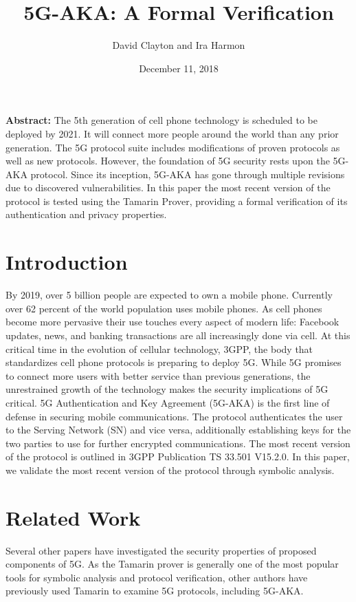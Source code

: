 \documentclass[10pt, pdftex]{article}
\title{5G-AKA: A Formal Verification}
\author{David Clayton and Ira Harmon}
\date{December 11, 2018}
\begin{document}
\maketitle
\textbf{Abstract:} 
The 5th generation of cell phone technology is scheduled to be deployed by 2021. It will connect more people around the world than any prior generation. The 5G protocol suite includes modifications of proven protocols as well as new protocols. However, the foundation of 5G security rests upon the 5G-AKA protocol. Since its inception, 5G-AKA has gone through multiple revisions due to discovered vulnerabilities. In this paper the most recent version of the protocol is tested using the Tamarin Prover, providing a formal verification of its authentication and privacy properties.

\newpage
\section{Introduction}
By 2019, over 5 billion people are expected to own a mobile phone. Currently over 62 percent of the world population uses mobile phones. As cell phones become more pervasive their use touches every aspect of modern life: Facebook updates, news, and banking transactions are all increasingly done via cell. At this critical time in the evolution of cellular technology, 3GPP, the body that standardizes cell phone protocols is preparing to deploy 5G. While 5G promises to connect more users with better service than previous generations, the unrestrained growth of the technology makes the security implications of 5G critical. 5G Authentication and Key Agreement (5G-AKA) is the first line of defense in securing mobile communications. The protocol authenticates the user to the Serving Network (SN) and vice versa, additionally establishing keys for the two parties to use for further encrypted communications. The most recent version of the protocol is outlined in 3GPP Publication TS 33.501 V15.2.0.\cite{threeGpp5Gspec} In this paper, we validate the most recent version of the protocol through symbolic analysis. 

\section{Related Work}

Several other papers have investigated the security properties of proposed components of 5G. As the Tamarin prover is generally one of the most popular tools for symbolic analysis and protocol verification, other authors have previously used Tamarin to examine 5G protocols, including 5G-AKA.
\end{document}
